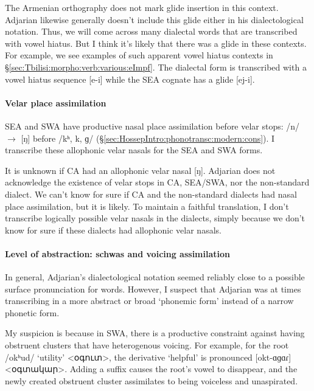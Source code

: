 The Armenian orthography does not mark glide insertion in this context. Adjarian likewise generally doesn't include this glide either in his dialectological notation. Thus, we will come across many dialectal words that are transcribed with vowel hiatus. But I think it's likely  that there was a glide in these  contexts. For example, we see examples of such apparent vowel hiatus contexts in \S\ref{sec:Tbilisi:morpho:verb:various:eImpf}. The dialectal form is transcribed with a vowel hiatus sequence [e-i] while the SEA cognate has a glide [ej-i]. 


\paragraph{Velar place assimilation}

SEA and SWA have productive nasal place assimilation before velar stops: /n/ $\rightarrow$ [ŋ] before /kʰ, k, ɡ/ (\S\ref{sec:HossepIntro:phonotransc:modern:cons}). I transcribe these allophonic velar nasals for the SEA and SWA forms. 

It is unknown if CA had an allophonic velar nasal [ŋ]. Adjarian does not acknowledge the existence of velar stops in CA, SEA/SWA, nor the non-standard dialect. We can't know for sure if CA and the non-standard dialects had nasal place assimilation, but it is likely. To maintain a faithful translation, I don't transcribe logically possible velar nasals in the dialects, simply because we don't know for sure if these dialects had allophonic velar nasals. 

\paragraph{Level of abstraction: schwas and   voicing assimilation}

In general, Adjarian's dialectological notation seemed reliably close to a possible surface pronunciation for words. However, I suspect that Adjarian was at times transcribing in a more abstract or broad `phonemic form' instead of a narrow phonetic form. 

My suspicion is because in SWA, there is a productive constraint against having obstruent clusters that have heterogenous voicing. For example, for the root /okʰud/ `utility' <օգուտ>, the derivative `helpful' is pronounced [okt-ɑɡɑɾ] <օգտակար>. Adding a suffix causes the root's vowel to disappear, and the newly created obstruent cluster assimilates to being voiceless and unaspirated. 

